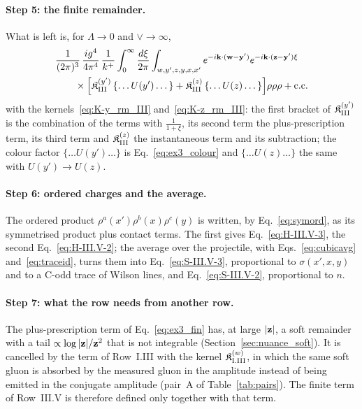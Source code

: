 \paragraph{Step 5: the finite remainder.} What is left is, for $\Lambda\to0$ and $\vee\to\infty$,
\begin{align}\label{eq:ex3_fin}
&\frac{1}{(2\pi)^3}\,\frac{ig^4}{4\pi^4}\,\frac{1}{k^+}\int_0^\infty\frac{d\xi}{2\pi}\int_{w,y',z,y,x,x'}e^{-i\mathbf{k}\cdot(\mathbf{w}-\mathbf{y}')}e^{-i\mathbf{k}\cdot(\mathbf{z}-\mathbf{y}')\xi}\notag\\
&\qquad\times\Big[\mathfrak K^{(y')}_{\rm III}\,\{\dots U(y')\dots\}+\mathfrak K^{(z)}_{\rm III}\,\{\dots U(z)\dots\}\Big]\rho\rho\rho+{\rm c.c.}
\end{align}
with the kernels~\eqref{eq:K-y_rm_III} and~\eqref{eq:K-z_rm_III}: the first bracket of $\mathfrak K^{(y')}_{\rm III}$ is the combination of the terms with $\frac{1}{1+\xi}$, its second term the plus-prescription term, its third term and $\mathfrak K^{(z)}_{\rm III}$ the instantaneous term and its subtraction; the colour factor $\{\dots U(y')\dots\}$ is Eq.~\eqref{eq:ex3_colour} and $\{\dots U(z)\dots\}$ the same with $U(y')\to U(z)$.

\paragraph{Step 6: ordered charges and the average.} The ordered product $\rho^a(x')\rho^b(x)\rho^c(y)$ is written, by Eq.~\eqref{eq:symord}, as its symmetrised product plus contact terms. The first gives Eq.~\eqref{eq:H-III.V-3}, the second Eq.~\eqref{eq:H-III.V-2}; the average over the projectile, with Eqs.~\eqref{eq:cubicavg} and~\eqref{eq:traceid}, turns them into Eq.~\eqref{eq:S-III.V-3}, proportional to $\sigma(x',x,y)$ and to a C-odd trace of Wilson lines, and Eq.~\eqref{eq:S-III.V-2}, proportional to $n$.

\paragraph{Step 7: what the row needs from another row.} The plus-prescription term of Eq.~\eqref{eq:ex3_fin} has, at large $|\mathbf{z}|$, a soft remainder with a tail $\propto\log|\mathbf{z}|/\mathbf{z}^2$ that is not integrable (Section~\ref{sec:nuance_soft}). It is cancelled by the term of Row~I.III with the kernel $\mathfrak K^{(w)}_{\rm I.III}$, in which the same soft gluon is absorbed by the measured gluon in the amplitude instead of being emitted in the conjugate amplitude (pair~A of Table~\ref{tab:pairs}). The finite term of Row~III.V is therefore defined only together with that term.

